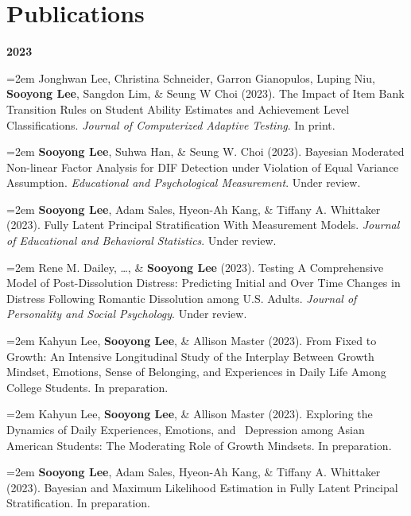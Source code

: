 \documentclass[11pt,letterpaper,]{awesome-me}
\begin{document}
\vspace{-1em}

\hypertarget{publications}{%
\section{Publications}\label{publications}}

\setlength{\leftskip}{0cm}

\textbf{2023}

\setlength{\leftskip}{0.5cm}

\hangindent=2em  Jonghwan Lee, Christina Schneider, Garron
Gianopulos, Luping Niu, \textbf{Sooyong Lee}, Sangdon Lim, \& Seung W
Choi (2023). The Impact of Item Bank Transition Rules on Student Ability
Estimates and Achievement Level Classifications. \emph{Journal of
Computerized Adaptive Testing}. In print.

\hangindent=2em  \textbf{Sooyong Lee}, Suhwa Han, \& Seung
W. Choi (2023). Bayesian Moderated Non-linear Factor Analysis for DIF
Detection under Violation of Equal Variance Assumption.
\emph{Educational and Psychological Measurement}. Under review.

\hangindent=2em  \textbf{Sooyong Lee}, Adam Sales, Hyeon-Ah
Kang, \& Tiffany A. Whittaker (2023). Fully Latent Principal
Stratification With Measurement Models. \emph{Journal of Educational and
Behavioral Statistics}. Under review.

\hangindent=2em  Rene M. Dailey, \ldots, \& \textbf{Sooyong
Lee} (2023). Testing A Comprehensive Model of Post-Dissolution Distress:
Predicting Initial and Over Time Changes in Distress Following Romantic
Dissolution among U.S. Adults. \emph{Journal of Personality and Social
Psychology}. Under review.

\hangindent=2em  Kahyun Lee, \textbf{Sooyong Lee}, \&
Allison Master (2023). From Fixed to Growth: An Intensive Longitudinal
Study of the Interplay Between Growth Mindset, Emotions, Sense of
Belonging, and Experiences in Daily Life Among College Students. In
preparation.

\hangindent=2em  Kahyun Lee, \textbf{Sooyong Lee}, \&
Allison Master (2023). Exploring the Dynamics of Daily Experiences,
Emotions, and ~Depression among Asian American Students: The Moderating
Role of Growth Mindsets. In preparation.

\hangindent=2em  \textbf{Sooyong Lee}, Adam Sales, Hyeon-Ah
Kang, \& Tiffany A. Whittaker (2023). Bayesian and Maximum Likelihood
Estimation in Fully Latent Principal Stratification. In preparation.
\end{document}

